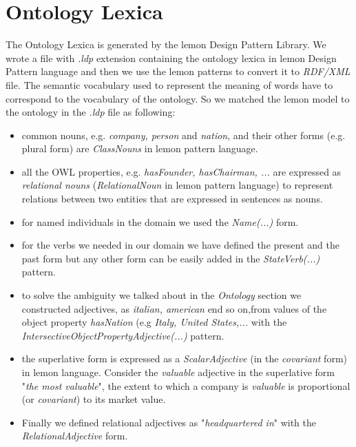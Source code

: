 \section{Ontology Lexica}
\label{sec:ontology-lexica}


The Ontology Lexica is generated by the lemon Design Pattern Library. We wrote a file with \textit{.ldp} extension containing the ontology lexica in lemon Design Pattern language and then we use the lemon patterns to convert it to \textit{RDF/XML} file. 
The semantic vocabulary used to represent the meaning of words have to correspond to the vocabulary of the ontology. So we matched the lemon model to the ontology in the \textit{.ldp} file as following:
\begin{itemize}
\item common nouns, e.g. \textit{company, person} and \textit{nation}, and their other forms (e.g. plural form) are \textit{ClassNouns} in lemon pattern language.
\item all the OWL properties, e.g. \textit{hasFounder, hasChairman, ...} are expressed as \textit{relational nouns} (\textit{RelationalNoun} in lemon pattern language) to represent relations between two entities that are expressed in sentences as nouns.
\item for named individuals in the domain we used the \textit{Name(...)} form.
\item for the verbs we needed in our domain we have defined the present and the past form but any other form can be easily added in the \textit{StateVerb(...)} pattern.
\item to solve the ambiguity we talked about in the \textit{Ontology} section we constructed adjectives, as \textit{italian, american} end so on,from values of the object property \textit{hasNation} (e.g \textit{Italy, United States,...} with the \textit{IntersectiveObjectPropertyAdjective(...)} pattern.
\item the superlative form is expressed as a \textit{ScalarAdjective} (in the \textit{covariant} form) in lemon language. Consider the \textit{valuable} adjective in the superlative form "\textit{the most valuable}", the extent to which a company is \textit{valuable} is proportional (or \textit{covariant}) to its market value.
\item Finally we defined relational adjectives as "\textit{headquartered in}" with the \textit{RelationalAdjective} form.
\end{itemize}
